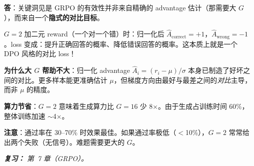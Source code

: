 \begin{questionbox}[Q24：论文 ``It Takes Two'' 表明 G=2 与 G=16 效果相当。这怎么可能？]
\textbf{答}：关键洞见是 GRPO 的有效性并非来自精确的 advantage 估计（那需要大 $G$），而来自一个\textbf{隐式的对比目标}。

$G=2$ 加二元 reward（一个对一个错）时：归一化后 $\hat{A}_\text{correct} = +1$，$\hat{A}_\text{wrong} = -1$。loss 变成：提升正确回答的概率、降低错误回答的概率。这本质上就是一个 DPO 风格的对比 loss！

\textbf{为什么大 $G$ 帮助不大}：归一化 advantage $\hat{A}_i = (r_i - \mu)/\sigma$ 本身已制造了好坏之间的对比。更多样本能更准确估计 $\mu$，但梯度方向由最好与最差之间的\emph{对比}主导，而非 $\mu$ 的精度。

\textbf{算力节省}：$G=2$ 意味着生成算力比 $G=16$ 少 8$\times$。由于生成占训练时间 60\%，整体训练加速 $\sim$4$\times$。

\textbf{注意}：通过率在 30--70\% 时效果最佳。如果通过率极低（$<$10\%），$G=2$ 常常给出两个失败（无信号）。难题需要更大的 $G$。

\emph{\textbf{复习：} 第~7 章（GRPO）。}
\end{questionbox}

